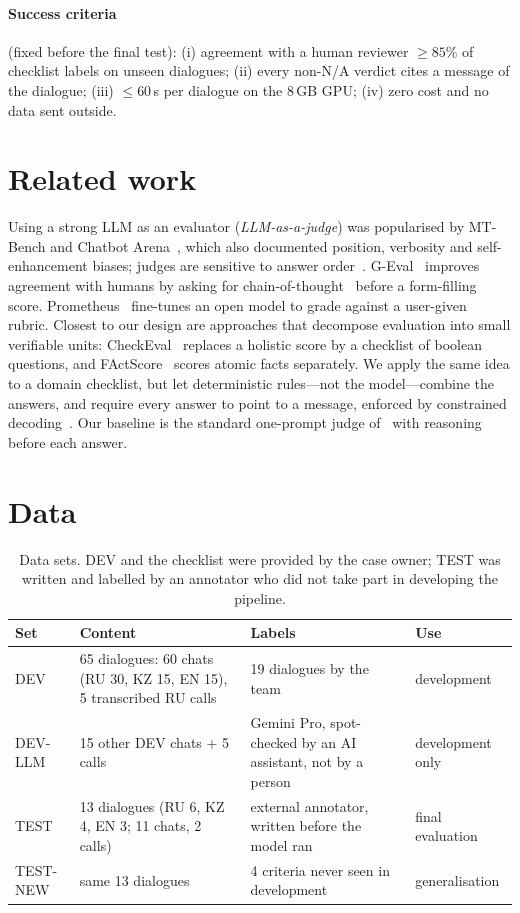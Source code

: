 \documentclass[11pt,a4paper]{article}
\begin{document}
\paragraph{Success criteria} (fixed before the final test): (i) agreement with a human reviewer
$\geq 85\%$ of checklist labels on unseen dialogues; (ii) every non-N/A verdict cites a message of the
dialogue; (iii) $\leq 60$\,s per dialogue on the 8\,GB GPU; (iv) zero cost and no data sent outside.

\section{Related work}
Using a strong LLM as an evaluator (\emph{LLM-as-a-judge}) was popularised by MT-Bench and Chatbot
Arena~\cite{zheng2023judging}, which also documented position, verbosity and self-enhancement biases;
judges are sensitive to answer order~\cite{wang2024fair}. G-Eval~\cite{liu2023geval} improves agreement with
humans by asking for chain-of-thought~\cite{wei2022cot} before a form-filling score. Prometheus~\cite{kim2024prometheus}
fine-tunes an open model to grade against a user-given rubric. Closest to our design are approaches that
decompose evaluation into small verifiable units: CheckEval~\cite{lee2024checkeval} replaces a holistic score
by a checklist of boolean questions, and FActScore~\cite{min2023factscore} scores atomic facts separately.
We apply the same idea to a domain checklist, but let deterministic rules---not the model---combine the
answers, and require every answer to point to a message, enforced by constrained decoding~\cite{willard2023guided}.
Our baseline is the standard one-prompt judge of~\cite{zheng2023judging,liu2023geval} with reasoning before
each answer.

\section{Data}
\begin{table}[h]\centering\small
\begin{tabularx}{\linewidth}{lXXl}
\toprule
Set & Content & Labels & Use\\
\midrule
DEV & 65 dialogues: 60 chats (RU 30, KZ 15, EN 15), 5 transcribed RU calls & 19 dialogues by the team & development\\
DEV-LLM & 15 other DEV chats + 5 calls & Gemini Pro, spot-checked by an AI assistant, not by a person & development only\\
TEST & 13 dialogues (RU 6, KZ 4, EN 3; 11 chats, 2 calls) & external annotator, written before the model ran & final evaluation\\
TEST-NEW & same 13 dialogues & 4 criteria never seen in development & generalisation\\
\bottomrule
\end{tabularx}
\caption{Data sets. DEV and the checklist were provided by the case owner; TEST was written and labelled by
an annotator who did not take part in developing the pipeline.}
\end{table}
\end{document}
